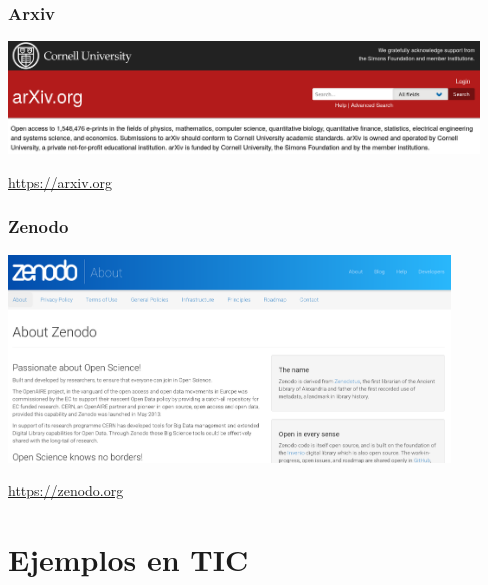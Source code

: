 \documentclass[17pt,aspectratio=169]{beamer}
\begin{document}
\begin{frame}
\frametitle{Arxiv}

\begin{center}
  \includegraphics[width=12.5cm]{figs/arxiv}
\end{center}  

\begin{flushright}
{\small \url{https://arxiv.org}}
\end{flushright}

\end{frame}

\begin{frame}
\frametitle{Zenodo}

\begin{center}
  \includegraphics[height=5.5cm]{figs/zenodo}
\end{center}  

\begin{flushright}
{\small \url{https://zenodo.org}}
\end{flushright}

\end{frame}

\section{Ejemplos en TIC}
\end{document}
